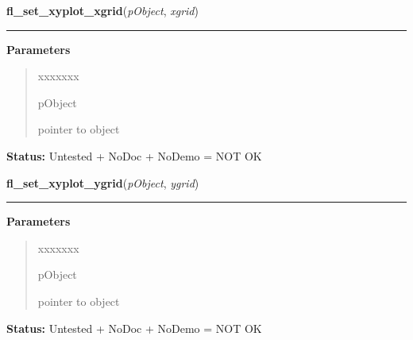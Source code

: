 \hspace{.8\funcindent}\begin{boxedminipage}{\funcwidth}

    \raggedright \textbf{fl\_set\_xyplot\_xgrid}(\textit{pObject}, \textit{xgrid})

    \vspace{-1.5ex}

    \rule{\textwidth}{0.5\fboxrule}
\setlength{\parskip}{2ex}
\setlength{\parskip}{1ex}
      \textbf{Parameters}
      \vspace{-1ex}

      \begin{quote}
        \begin{Ventry}{xxxxxxx}

          \item[pObject]

          pointer to object

        \end{Ventry}

      \end{quote}

\textbf{Status:} Untested + NoDoc + NoDemo = NOT OK



    \end{boxedminipage}

    \label{xformslib:library:fl_set_xyplot_ygrid}

    \vspace{0.5ex}

\hspace{.8\funcindent}\begin{boxedminipage}{\funcwidth}

    \raggedright \textbf{fl\_set\_xyplot\_ygrid}(\textit{pObject}, \textit{ygrid})

    \vspace{-1.5ex}

    \rule{\textwidth}{0.5\fboxrule}
\setlength{\parskip}{2ex}
\setlength{\parskip}{1ex}
      \textbf{Parameters}
      \vspace{-1ex}

      \begin{quote}
        \begin{Ventry}{xxxxxxx}

          \item[pObject]

          pointer to object

        \end{Ventry}

      \end{quote}

\textbf{Status:} Untested + NoDoc + NoDemo = NOT OK



    \end{boxedminipage}


